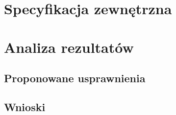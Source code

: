 \chapter{Specyfikacja zewnętrzna}\label{Chapter_SpecyfikacjaZewnetrzna}

\chapter{Analiza rezultatów}\label{Chapter_AnalizaRezultatow}

\section{Proponowane usprawnienia}\label{Section_Usprawnienia}
\cite{HandOverFaceOcclusion07}

\section{Wnioski}\label{Section_Wnioski}